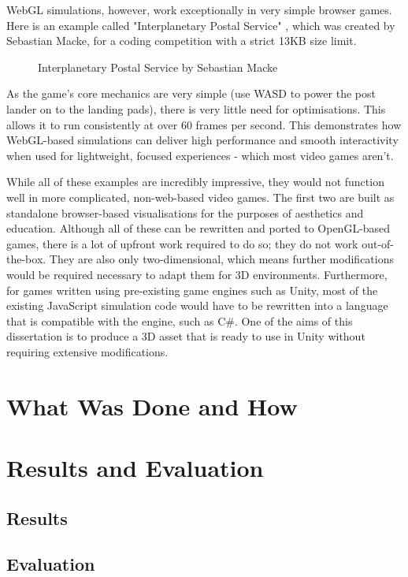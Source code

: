 \documentclass[12pt]{article}
\newcommand{\wideimage}[2][]{%
  \makebox[\textwidth][c]{\texttt{[image: \#2]}}%
}
\begin{document}
    WebGL simulations, however, work exceptionally in very simple browser games. Here is an example called "Interplanetary Postal Service" \cite{ips}, which was created by Sebastian Macke, for a coding competition with a strict 13KB size limit.

    \begin{figure}[H]
        \noindent\wideimage[]{webGLIPS.png}
        \caption{Interplanetary Postal Service by Sebastian Macke \cite{ips}}
    \end{figure}

    As the game's core mechanics are very simple (use WASD to power the post lander on to the landing pads), there is very little need for optimisations. This allows it to run consistently at over 60 frames per second. This demonstrates how WebGL-based simulations can deliver high performance and smooth interactivity when used for lightweight, focused experiences - which most video games aren't.

    While all of these examples are incredibly impressive, they would not function well in more complicated, non-web-based video games. The first two are built as standalone browser-based visualisations for the purposes of aesthetics and education. Although all of these can be rewritten and ported to OpenGL-based games, there is a lot of upfront work required to do so; they do not work out-of-the-box. They are also only two-dimensional, which means further modifications would be required necessary to adapt them for 3D environments. Furthermore, for games written using pre-existing game engines such as Unity, most of the existing JavaScript simulation code would have to be rewritten into a language that is compatible with the engine, such as C\#. One of the aims of this dissertation is to produce a 3D asset that is ready to use in Unity without requiring extensive modifications.

    \section{What Was Done and How}

    \section{Results and Evaluation}
    \subsection{Results}
    \subsection{Evaluation}
\end{document}

